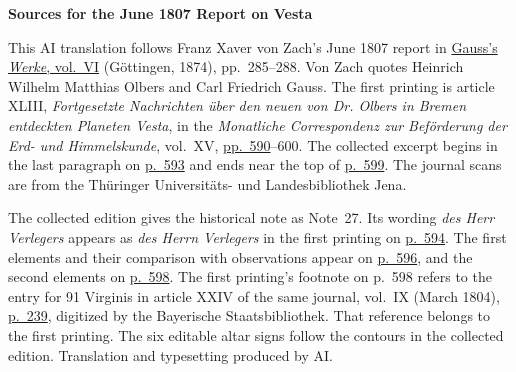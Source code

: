\clearpage\thispagestyle{empty}
\begin{center}\textbf{Sources for the June 1807 Report on Vesta}\end{center}
\noindent This AI translation follows Franz Xaver von Zach’s June 1807 report in \href{https://gdz.sub.uni-goettingen.de/id/PPN236007467}{Gauss’s \textit{Werke}, vol.~VI} (Göttingen, 1874), pp.~285--288. Von Zach quotes Heinrich Wilhelm Matthias Olbers and Carl Friedrich Gauss. The first printing is article XLIII, \textit{Fortgesetzte Nachrichten über den neuen von Dr. Olbers in Bremen entdeckten Planeten Vesta}, in the \textit{Monatliche Correspondenz zur Beförderung der Erd- und Himmelskunde}, vol.~XV, \href{https://zs.thulb.uni-jena.de/rsc/viewer/jportal_derivate_00237836/Monatliche_Correspondenz_130168688_15_1807_0597.tif}{pp.~590}--600. The collected excerpt begins in the last paragraph on \href{https://zs.thulb.uni-jena.de/rsc/viewer/jportal_derivate_00237836/Monatliche_Correspondenz_130168688_15_1807_0600.tif}{p.~593} and ends near the top of \href{https://zs.thulb.uni-jena.de/rsc/viewer/jportal_derivate_00237836/Monatliche_Correspondenz_130168688_15_1807_0606.tif}{p.~599}. The journal scans are from the Thüringer Universitäts- und Landesbibliothek Jena.
\par\medskip
The collected edition gives the historical note as Note~27. Its wording \textit{des Herr Verlegers} appears as \textit{des Herrn Verlegers} in the first printing on \href{https://zs.thulb.uni-jena.de/rsc/viewer/jportal_derivate_00237836/Monatliche_Correspondenz_130168688_15_1807_0601.tif}{p.~594}. The first elements and their comparison with observations appear on \href{https://zs.thulb.uni-jena.de/rsc/viewer/jportal_derivate_00237836/Monatliche_Correspondenz_130168688_15_1807_0603.tif}{p.~596}, and the second elements on \href{https://zs.thulb.uni-jena.de/rsc/viewer/jportal_derivate_00237836/Monatliche_Correspondenz_130168688_15_1807_0605.tif}{p.~598}. The first printing’s footnote on p.~598 refers to the entry for 91 Virginis in article XXIV of the same journal, vol.~IX (March 1804), \href{https://www.digitale-sammlungen.de/en/view/bsb10538601?page=253}{p.~239}, digitized by the Bayerische Staatsbibliothek. That reference belongs to the first printing. The six editable altar signs follow the contours in the collected edition. Translation and typesetting produced by AI.
\clearpage
